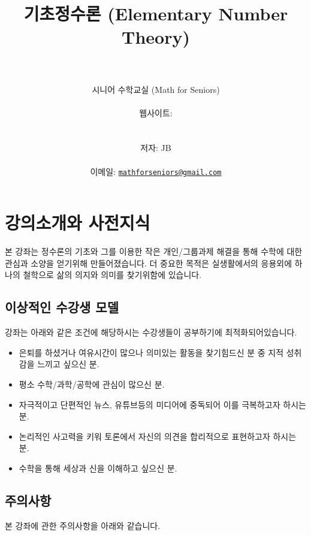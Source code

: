 \documentclass[a4paper, 11pt]{report}
\title{\textbf{기초정수론 (Elementary Number Theory)}}
\author{\instrdate\\\\[.5ex]
 시니어 수학교실 (Math for Seniors)\\\\웹사이트: \\\\\\
 저자: JB\\\\이메일: \href{mailto:mathforseniors@gmail.com}{\texttt{mathforseniors@gmail.com}}}
\date{}
\renewcommand{\<}{\langle}
\renewcommand{\>}{\rangle}
\begin{document}
\maketitle
{}

\begingroup
\small
\tableofcontents
\endgroup


\newpage %

\chapter{강의소개와 사전지식}

본 강좌는 정수론의 기초와 그를 이용한 작은 개인/그룹과제 해결을 통해
수학에 대한 관심과 소양을 얻기위해 만들어졌습니다. 더 중요한 목적은 
실생활에서의 응용외에 하나의 철학으로 삶의 의지와 의미를 찾기위함에 
있습니다.

\section{이상적인 수강생 모델}

강좌는 아래와 같은 조건에 해당하시는 수강생들이 공부하기에 최적화되어있습니다.

\begin{itemize}
  \item 은퇴를 하셨거나 여유시간이 많으나 의미있는 활동을 찾기힘드신 분 중
  지적 성취감을 느끼고 싶으신 분.
  \item 평소 수학/과학/공학에 관심이 많으신 분.
  \item 자극적이고 단편적인 뉴스, 유튜브등의 미디어에 중독되어 이를 극복하고자
  하시는 분.
  \item 논리적인 사고력을 키워 토론에서 자신의 의견을 합리적으로 표현하고자
  하시는 분.
  \item 수학을 통해 세상과 신을 이해하고 싶으신 분.
\end{itemize}

\section{주의사항}

본 강좌에 관한 주의사항을 아래와 같습니다.
\end{document}

